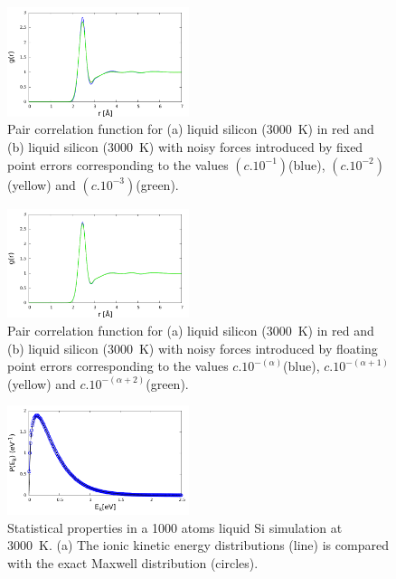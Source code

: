\documentclass[aps,pre,twocolumn,showpacs,preprintnumbers,amsmath,amssymb]{revtex4-1}
\begin{document}
\begin{figure}[h!]%
\begin{center}
\includegraphics[width=0.475\textwidth]
{figures/fixedpoint.pdf}
\end{center}
\caption{\label{Fig1}
Pair correlation function for (a) liquid silicon (3000~K) in red and (b) liquid silicon (3000~K) with noisy forces introduced by fixed point errors corresponding to the values \(\left ( c.10^{-1 }\right ) \)(blue), \(\left ( c.10^{-2 }\right ) \)(yellow) and \(\left ( c.10^{-3 } \right ) \)(green).
} \end{figure}

\begin{figure}[h!]%
\begin{center}
\includegraphics[width=0.475\textwidth]
{figures/floatingpoint.pdf}
\end{center}
\caption{\label{Fig2}
Pair correlation function for (a) liquid silicon (3000~K) in red and (b) liquid silicon (3000~K) with noisy forces introduced by floating point errors corresponding to the values \(c.10^{-(\alpha)}\)(blue), \(c.10^{-(\alpha+1)}\)(yellow) and \(c.10^{-(\alpha+2)}\)(green).
} \end{figure}

\begin{figure}[h!]%
\begin{center}
\includegraphics[width=0.475\textwidth]
{figures/maxwelldistribution.pdf}
\end{center}
\caption{\label{Fig3}
Statistical properties in a 1000 atoms liquid Si simulation at 3000~K. (a) The ionic kinetic energy distributions (line) is compared with the exact Maxwell distribution (circles).
} \end{figure}
\end{document}
